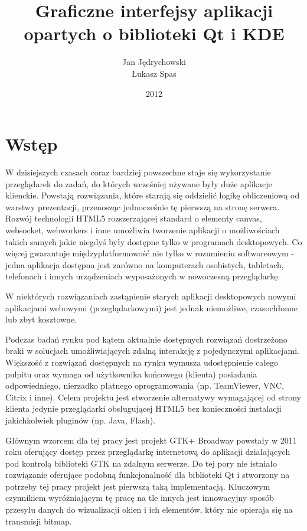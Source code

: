 \documentclass[polish]{inz}
\title{Graficzne interfejsy aplikacji opartych o biblioteki Qt i KDE}
\author{Jan J\k{e}drychowski\\\L{}ukasz Spas}
\date{2012}
\begin{document}
\maketitle

\chapter{Wstęp}

W dzisiejszych czasach coraz bardziej powszechne staje się wykorzystanie przeglądarek do zadań, do których wcześniej używane były duże aplikacje klienckie. Powstają rozwiązania, które starają się oddzielić logikę obliczeniową od warstwy prezentacji, przenosząc jednocześnie tę pierwszą na stronę serwera. Rozwój technologii HTML5 rozszerzającej standard o elementy canvas, websocket, webworkers i inne umożliwia tworzenie aplikacji o możliwościach takich samych jakie niegdyś były dostępne tylko w programach desktopowych. Co więcej gwarantuje międzyplatformowość nie tylko w rozumieniu softwareowym - jedna aplikacja dostępna jest zarówno na komputerach osobistych, tabletach, telefonach i innych urządzeniach wyposażonych w nowoczesną przeglądarkę.

W niektórych rozwiązaniach zastąpienie starych aplikacji desktopowych nowymi aplikacjami webowymi (przeglądarkowymi) jest jednak niemożliwe, czasochłonne lub zbyt kosztowne.

Podczas badań rynku pod kątem aktualnie dostępnych rozwiązań dostrzeżono braki w solucjach umożliwiających zdalną interakcję z pojedynczymi aplikacjami. Większość z rozwiązań dostępnych na rynku wymusza udostępnienie całego pulpitu oraz wymaga od użytkownika końcowego (klienta) posiadania odpowiedniego, nierzadko płatnego oprogramowania (np. TeamViewer, VNC, Citrix i inne). Celem projektu jest stworzenie alternatywy wymagającej od strony klienta jedynie przeglądarki obsługującej HTML5 bez konieczności instalacji jakichkolwiek pluginów (np. Java, Flash).

Głównym wzorcem dla tej pracy jest projekt GTK+ Broadway powstały w 2011 roku oferujący dostęp przez przeglądarkę internetową do aplikacji działających pod kontrolą biblioteki GTK na zdalnym serwerze. Do tej pory nie istniało rozwiązanie oferujące podobną funkcjonalność dla biblioteki Qt i stworzony na potrzeby tej pracy projekt jest pierwszą taką implementacją. Kluczowym czynnikiem wyróżniającym tę pracę na tle innych jest innowacyjny sposób przesyłu danych do wizualizacji okien i ich elementów, który nie opieraja się na transmisji bitmap.
\end{document}
